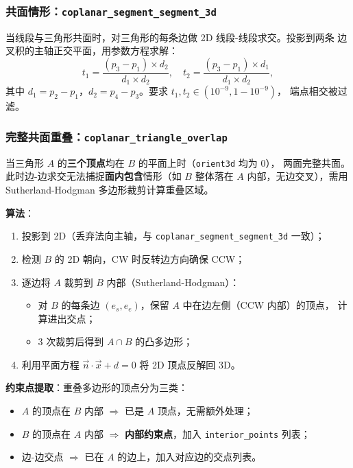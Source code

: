 \documentclass[11pt,a4paper]{article}
\begin{document}
\subsubsection{共面情形：\texttt{coplanar\_segment\_segment\_3d}}

当线段与三角形共面时，对三角形的每条边做 2D 线段-线段求交。投影到两条
边叉积的主轴正交平面，用参数方程求解：
\[
  t_1 = \frac{(p_3 - p_1) \times d_2}{d_1 \times d_2},\quad
  t_2 = \frac{(p_3 - p_1) \times d_1}{d_1 \times d_2},
\]
其中 $d_1 = p_2 - p_1$，$d_2 = p_4 - p_3$。要求 $t_1, t_2 \in (10^{-9}, 1-10^{-9})$，
端点相交被过滤。

\subsubsection{完整共面重叠：\texttt{coplanar\_triangle\_overlap}}

当三角形 $A$ 的\textbf{三个顶点}均在 $B$ 的平面上时（\texttt{orient3d} 均为 0），
两面完整共面。此时边-边求交无法捕捉\textbf{面内包含}情形（如 $B$ 整体落在
$A$ 内部，无边交叉），需用 Sutherland-Hodgman 多边形裁剪计算重叠区域。

\textbf{算法}：
\begin{enumerate}
  \item 投影到 2D（丢弃法向主轴，与 \texttt{coplanar\_segment\_segment\_3d} 一致）；
  \item 检测 $B$ 的 2D 朝向，CW 时反转边方向确保 CCW；
  \item 逐边将 $A$ 裁剪到 $B$ 内部（Sutherland-Hodgman）：
    \begin{itemize}
      \item 对 $B$ 的每条边 $(e_s, e_e)$，保留 $A$ 中在边左侧（CCW 内部）的顶点，
            计算进出交点；
      \item 3 次裁剪后得到 $A \cap B$ 的凸多边形；
    \end{itemize}
  \item 利用平面方程 $\vec{n} \cdot \vec{x} + d = 0$ 将 2D 顶点反解回 3D。
\end{enumerate}

\textbf{约束点提取}：重叠多边形的顶点分为三类：
\begin{itemize}
  \item $A$ 的顶点在 $B$ 内部 $\Rightarrow$ 已是 $A$ 顶点，无需额外处理；
  \item $B$ 的顶点在 $A$ 内部 $\Rightarrow$ \textbf{内部约束点}，加入
        \texttt{interior\_points} 列表；
  \item 边-边交点 $\Rightarrow$ 已在 $A$ 的边上，加入对应边的交点列表。
\end{itemize}
\end{document}
